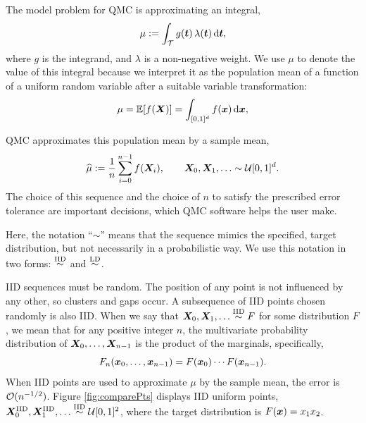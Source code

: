 \documentclass[graybox,footinfo]{svmult}
\newcommand{\hmu}{\widehat{\mu}}
\newcommand{\IID}{\textup{IID}}
\newcommand{\LD}{\textup{LD}}
\newcommand{\IIDsim}{\overset{\IID}{\sim}}
\newcommand{\LDsim}{\overset{\LD}{\sim}}
\newcommand{\cube}{[0,1]^d}
\begin{document}
The model problem for QMC is approximating an integral,
\begin{equation} \label{eq:integral}
	\mu := \int_\calT g(\bst) \, \lambda(\bst) \, \D \bst,
\end{equation}
where $g$ is the integrand, and $\lambda$ is a non-negative weight.  We use $\mu$ to denote the value of this integral because we interpret it as the population mean of a function of a uniform random variable after a suitable variable transformation:
\begin{equation} \label{eq:fintegral}
	\mu = \bbE[f(\bsX)] =  \int_{\cube}  f(\bsx) \,  \D \bsx ,
\end{equation}

QMC approximates this population mean by a sample mean,
\begin{equation} \label{eq:samplemean}
	\hmu := \frac 1n \sum_{i=0}^{n-1} f(\bsX_i), \qquad \bsX_0, \bsX_1, \ldots \sim \calU\cube.
\end{equation}
The choice of this sequence and the choice of $n$ to satisfy  the prescribed error tolerance are important decisions, which  QMC software helps the user make.

Here, the notation ``$\sim$'' means that the sequence mimics the specified, target distribution, but not necessarily in a probabilistic way.  We  use this notation in two forms:  $\IIDsim$ and $\LDsim$.

IID sequences must be random. The position of any point is not influenced by any other, so clusters and gaps occur.  A subsequence of IID points chosen randomly is also IID.  When we say that $\bsX_0, \bsX_1, \ldots \IIDsim F$ for some distribution $F$, we mean that for any positive integer $n$, the  multivariate probability distribution of ${\boldsymbol{X}}_0, \ldots, {\boldsymbol{X}}_{n-1}$ is the product of the marginals, specifically,
\begin{equation*}
	F_{n}({\boldsymbol{x}}_0, \ldots, {\boldsymbol{x}}_{n-1}) = F({\boldsymbol{x}}_0) \cdots  F({\boldsymbol{x}}_{n-1}).
\end{equation*}
When IID points are used to approximate $\mu$ by the sample mean, the error is ${\mathcal{O}}(n^{-1/2})$.  Figure \ref{fig:comparePts} displays IID uniform points, $\bsX^{\IID}_0, \bsX^{\IID}_1, \ldots \IIDsim \calU[0,1]^2$, where the target distribution is $F({\boldsymbol{x}}) = x_1 x_2$.
\end{document}
